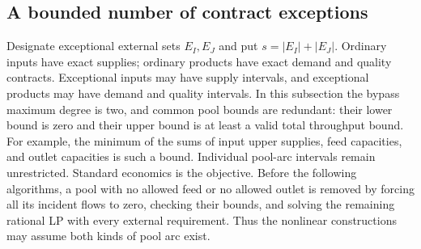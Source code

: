 \subsection{A bounded number of contract exceptions}\label{s5:exceptions}

Designate exceptional external sets $E_I,E_J$ and put
$s=|E_I|+|E_J|$. Ordinary inputs have exact supplies; ordinary products
have exact demand and quality contracts. Exceptional inputs may have
supply intervals, and exceptional products may have demand and quality
intervals. In this subsection the bypass maximum degree is two, and
common pool bounds are redundant: their lower bound is zero and their
upper bound is at least a valid total throughput bound. For example,
the minimum of the sums of input upper supplies, feed capacities, and
outlet capacities is such a bound. Individual pool-arc intervals remain
unrestricted. Standard economics is the objective. Before the following
algorithms, a pool with no allowed feed or no allowed outlet is removed
by forcing all its incident flows to zero, checking their bounds, and
solving the remaining rational LP with every external requirement.
Thus the nonlinear constructions may assume both kinds of pool arc exist.

